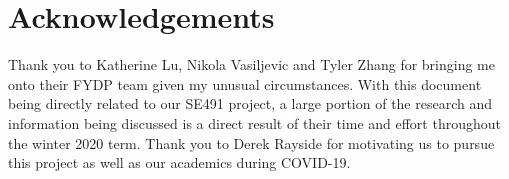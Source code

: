 \frontmatter
\section*{Acknowledgements}
Thank you to Katherine Lu, Nikola Vasiljevic and Tyler Zhang for bringing me onto their FYDP team given my unusual circumstances. With this document being directly related to our SE491 project, a large portion of the research and information being discussed is a direct result of their time and effort throughout the winter 2020 term.
\newline\newline
Thank you to Derek Rayside for motivating us to pursue this project as well as our academics during COVID-19.
